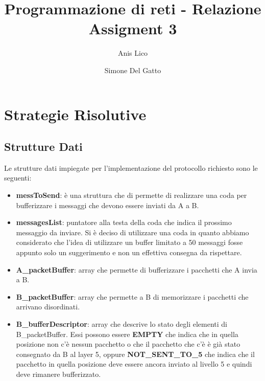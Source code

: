 \documentclass[a4paper]{article}
\author{Anis Lico \and Simone Del Gatto}
\title{Programmazione di reti - Relazione Assigment 3}
\begin{document}
\maketitle



\tableofcontents

\section{Strategie Risolutive}

\subsection{Strutture Dati}
Le strutture dati impiegate per l'implementazione del protocollo richiesto sono le seguenti:
\begin{itemize}

\item \textbf{messToSend}: è una struttura che di permette di realizzare una coda per bufferizzare i messaggi che devono essere inviati da A a B. 

\item \textbf{messagesList}: puntatore alla testa della coda che indica il prossimo messaggio da inviare. Si è deciso di utilizzare una coda in quanto abbiamo considerato che l'idea di utilizzare un buffer limitato a 50 messaggi fosse appunto solo un suggerimento e non un effettiva consegna da rispettare.

\item \textbf{A\_packetBuffer}: array che permette di bufferizzare i pacchetti che A invia a B.

\item \textbf{B\_packetBuffer}: array che permette a B di memorizzare i pacchetti che arrivano disordinati.

\item \textbf{B\_bufferDescriptor}: array che descrive lo stato degli elementi di B\_packetBuffer. Essi possono essere \textbf{EMPTY} che indica che in quella posizione non c'è nessun pacchetto o che il pacchetto che c'è è già stato consegnato da B al layer 5, oppure \textbf{NOT\_SENT\_TO\_5} che indica che il pacchetto in quella posizione deve essere ancora inviato al livello 5 e quindi deve rimanere bufferizzato.

\end{itemize}
\end{document}
